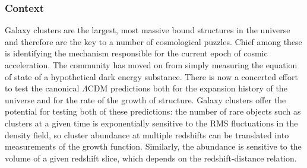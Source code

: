 %
%

\subsubsection{Context}

Galaxy clusters are the largest, most massive bound structures in the
universe and therefore are the key to a number of cosmological
puzzles. Chief among these is identifying the mechanism responsible
for the current epoch of cosmic acceleration. The community has moved
on from simply measuring the equation of state of a hypothetical dark
energy substance. There is now a concerted effort to test the
canonical $ \Lambda$CDM predictions both for the expansion history of
the universe and for the rate of the growth of structure. Galaxy
clusters offer the potential for testing both of these predictions:
the number of rare objects such as clusters at a given time is
exponentially sensitive to the RMS fluctuations in the density field,
so cluster abundance at multiple redshifts can be translated into measurements of the growth function. Similarly, the abundance is
sensitive to the volume of a given redshift slice, which depends on
the redshift-distance relation.

